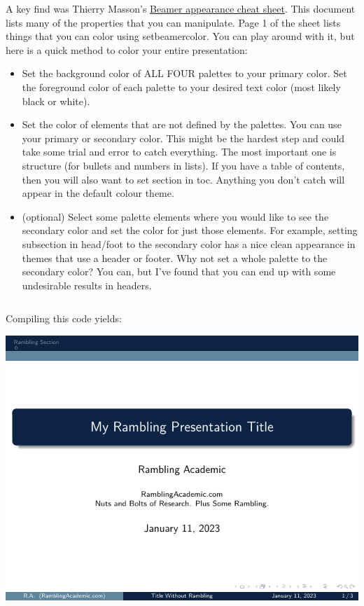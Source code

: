 \begin{column}{0.5\textwidth}
A key find was Thierry Masson’s \href{http://www.cpt.univ-mrs.fr/~masson/latex/Beamer-appearance-cheat-sheet.pdf}{Beamer appearance cheat sheet}. This document lists many of the properties that you can manipulate. Page 1 of the sheet lists things that you can color using {\ttfamily setbeamercolor}. You can play around with it, but here is a quick method to color your entire presentation:

\begin{itemize}
  \item Set the background color of ALL FOUR palettes to your primary color. Set the foreground color of each palette to your desired text color (most likely black or white).
  \item Set the color of elements that are not defined by the palettes. You can use your primary or secondary color. This might be the hardest step and could take some trial and error to catch everything. The most important one is {\ttfamily structure} (for bullets and numbers in lists). If you have a table of contents, then you will also want to set {\ttfamily section} in {\ttfamily toc}. Anything you don’t catch will appear in the default colour theme.
  \item (optional) Select some palette elements where you would like to see the secondary color and set the color for just those elements. For example, setting {\ttfamily subsection} in {\ttfamily head/foot} to the secondary color has a nice clean appearance in themes that use a header or footer. Why not set a whole palette to the secondary color? You can, but I’ve found that you can end up with some undesirable results in headers.
\end{itemize}

\inputminted[linenos=true]{latex}{examples/beamer/color-setbeamercolor.tex}

Compiling this code yields:

\includegraphics[page=1]{examples/beamer/color-setbeamercolor.pdf}


\end{column}
